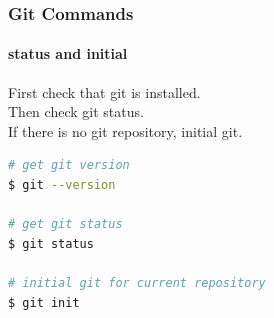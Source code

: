 \documentclass{beamer}
\begin{document}
	
		
	\begin{frame}[fragile]
		\frametitle{Git Commands}
		\framesubtitle{status and initial}

First check that git is installed.\\
Then check git status.\\
If there is no git repository, initial git.

\begin{lstlisting}[language=bash]
# get git version
$ git --version

# get git status
$ git status

# initial git for current repository
$ git init
\end{lstlisting}

	\end{frame}
	
\end{document}
